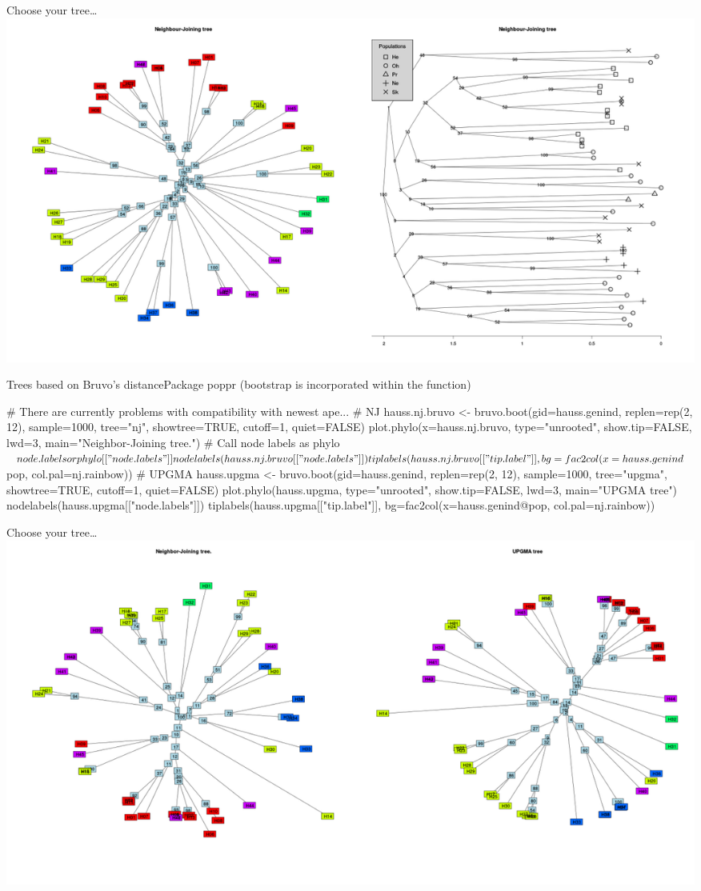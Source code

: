 \documentclass[compress, ucs, xelatex, 11pt, xcolor=svgnames,
  hyperref={
    bookmarks=true,
    unicode=true,
    colorlinks=true,
    pdftitle={Molecular data in R},
    plainpages=false,
    pdfauthor={Vojtech Zeisek},
    pdfsubject={Course about phylogeny and evolution in R},
    pdfcreator={XeLaTeX},
    pdfkeywords={R, evolution, phylogeny, molecular data},
    linkcolor=Tomato,
    anchorcolor=SaddleBrown,
    citecolor=Goldenrod,
    filecolor=DarkMagenta,
    menucolor=Sienna,
    urlcolor=DarkTurquoise,
    pdftex},
  url={hyphens, lowtilde} %
  ]{beamer}
\begin{document}
\begin{frame}{Choose your tree\ldots}
\includegraphics[width=\textwidth]{nj2.png}
\end{frame}

\begin{frame}[fragile]{Trees based on Bruvo's distance}{Package poppr (bootstrap is incorporated within the function)}
  \begin{spluscode}
    # There are currently problems with compatibility with newest ape...
    # NJ
    hauss.nj.bruvo <- bruvo.boot(gid=hauss.genind, replen=rep(2, 12),
      sample=1000, tree="nj", showtree=TRUE, cutoff=1, quiet=FALSE)
    plot.phylo(x=hauss.nj.bruvo, type="unrooted", show.tip=FALSE,
      lwd=3, main="Neighbor-Joining tree.")
    # Call node labels as phylo$node.labels or phylo[["node.labels"]]
    nodelabels(hauss.nj.bruvo[["node.labels"]]) 
    tiplabels(hauss.nj.bruvo[["tip.label"]], bg=fac2col(x=hauss.genind$pop,
      col.pal=nj.rainbow))
    # UPGMA
    hauss.upgma <- bruvo.boot(gid=hauss.genind, replen=rep(2, 12),
      sample=1000, tree="upgma", showtree=TRUE, cutoff=1, quiet=FALSE)
    plot.phylo(hauss.upgma, type="unrooted", show.tip=FALSE, lwd=3,
      main="UPGMA tree")
    nodelabels(hauss.upgma[["node.labels"]])
    tiplabels(hauss.upgma[["tip.label"]], bg=fac2col(x=hauss.genind@pop,
      col.pal=nj.rainbow))
  \end{spluscode}
\end{frame}

\begin{frame}{Choose your tree\ldots}
\includegraphics[width=\textwidth]{nj-upgma-bruvo.png}
\end{frame}
\end{document}
